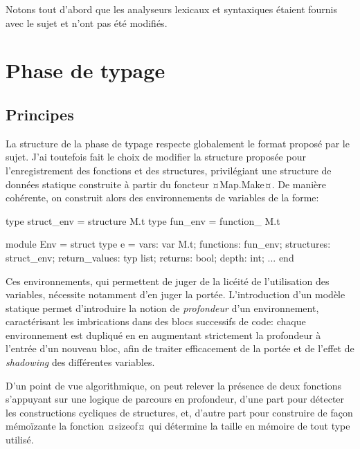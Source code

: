 \documentclass{rapport}
\date{25 janvier 2022}
\begin{document}



Notons tout d'abord que les analyseurs lexicaux et syntaxiques étaient fournis avec le sujet et n'ont pas été modifiés.

\section{Phase de typage}

\subsection{Principes}
La structure de la phase de typage respecte globalement le format proposé par le sujet. J'ai toutefois fait le choix de modifier la structure proposée pour l'enregistrement des fonctions et des structures, privilégiant une structure de données statique construite à partir du foncteur ¤Map.Make¤. De manière cohérente, on construit alors des environnements de variables de la forme:


\begin{caml}
type struct_env = structure M.t
type fun_env = function_ M.t

module Env = struct
  type e = {
    vars: var M.t;
    functions: fun_env;
    structures: struct_env;
    return_values: typ list;
    returns: bool;
    depth: int;
  }
  ...
end
\end{caml}

Ces environnements, qui permettent de juger de la licéité de l'utilisation des variables, nécessite notamment d'en juger la portée. L'introduction d'un modèle statique permet d'introduire la notion de \emph{profondeur} d'un environnement, caractérisant les imbrications dans des blocs successifs de code: chaque environnement est dupliqué en en augmentant strictement la profondeur à l'entrée d'un nouveau bloc, afin de traiter efficacement de la portée et de l'effet de \emph{shadowing} des différentes variables.

D'un point de vue algorithmique, on peut relever la présence de deux fonctions s'appuyant sur une logique de parcours en profondeur, d'une part pour détecter les constructions cycliques de structures, et, d'autre part pour construire de façon mémoïzante la fonction ¤sizeof¤ qui détermine la taille en mémoire de tout type utilisé.
\end{document}
